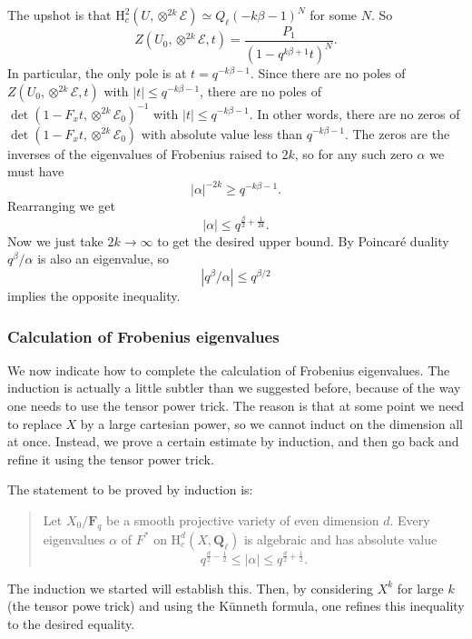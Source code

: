 \documentclass[letterpaper,11pt]{article}
\newcommand{\F}{\mathbf{F}}
\newcommand{\Q}{\mathbf{Q}}
\newcommand{\Cal}[1]{\mathcal{#1}}
\newcommand{\mrm}[1]{\mathrm{#1}}
\begin{document}
The upshot is that $\mrm{H}_c^2(U, \otimes^{2k} \Cal{E}) \simeq Q_{\ell}(-k\beta-1)^N$ for some $N$. So 
\[
Z(U_0, \otimes^{2k} \Cal{E}, t) = \frac{P_1}{(1-q^{k \beta+1}t)^N}.
\]
In particular, the only pole is at $t=q^{-k\beta-1}$. Since there are no poles of $Z(U_0, \otimes^{2k} \Cal{E}, t) $ with $|t| \leq q^{-k\beta-1}$, there are no poles of $\det (1-F_x t,  \otimes^{2k} \Cal{E}_0)^{-1}$ with $|t| \leq q^{-k\beta-1}$. In other words, there are no zeros of $\det (1-F_x t,  \otimes^{2k} \Cal{E}_0)$ with absolute value less than $q^{-k \beta-1}$. The zeros are the inverses of the eigenvalues of Frobenius raised to $2k$, so for any such zero $\alpha$ we must have 
\[
|\alpha|^{-2k} \geq q^{-k \beta-1}.
\]
Rearranging we get 
\[
|\alpha| \leq  q^{\frac{\beta}{2} +\frac{1}{2k}}.
\]
Now we just take $2k \rightarrow \infty$ to get the desired upper bound. By Poincar\'{e} duality $q^{\beta}/\alpha$ is also an eigenvalue, so 
\[
|q^{\beta}/\alpha| \leq  q^{\beta/2}  
\]
implies the opposite inequality. 

\subsubsection{Calculation of Frobenius eigenvalues}
We now indicate how to complete the calculation of Frobenius eigenvalues. The induction is actually a little subtler than we suggested before, because of the way one needs to use the tensor power trick. The reason is that at some point we need to replace $X$ by a large cartesian power, so we cannot induct on the dimension all at once. Instead, we prove a certain estimate by induction, and then go back and refine it using the tensor power trick. 

The statement to be proved by induction is: 
\begin{quotation}
Let $X_0/\F_q$ be a smooth projective variety of even dimension $d$. Every eigenvalues $\alpha$ of $F^*$ on $\mrm{H}_c^d(X,\Q_{\ell})$ is algebraic and has absolute value
\begin{equation}\label{estimate}
q^{\frac{d}{2}-\frac{1}{2}} \leq |\alpha| \leq q^{\frac{d}{2} + \frac{1}{2}}.
\end{equation}
\end{quotation}

The induction we started will establish this. Then, by considering $X^k$ for large $k$ (the tensor powe trick) and using the K\"{u}nneth formula, one refines this inequality to the desired equality. \\
\end{document}
